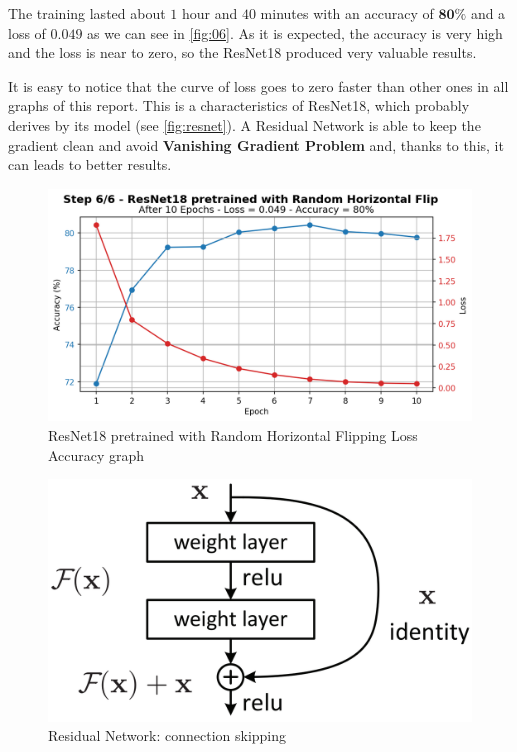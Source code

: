 \documentclass[a4paper, 11pt]{article}
\begin{document}
	The training lasted about $1$ hour and $40$ minutes with an accuracy of $\boldsymbol{80\%}$ and a loss of $\boldsymbol{0.049}$ as we can see in \vref{fig:06}.
	As it is expected, the accuracy is very high and the loss is near to zero, so the ResNet18 produced very valuable results.
	
	It is easy to notice that the curve of loss goes to zero faster than other ones in all graphs of this report.
	This is a characteristics of ResNet18, which probably derives by its model (see \vref{fig:resnet}). A Residual Network is able to keep the gradient clean and avoid \textbf{Vanishing Gradient Problem} and, thanks to this, it can leads to better results.
	
	
	\begin{figure}[ht!]
		\centering
		\includegraphics[width=0.62\paperwidth]{img/fig06.png}
		\caption{ResNet18 pretrained with Random Horizontal Flipping Loss Accuracy graph}
		\label{fig:06}
	\end{figure}

\begin{figure}[ht!]
	\centering
	\includegraphics[width=0.3\paperwidth]{img/res.png}
	\caption{Residual Network: connection skipping}
	\label{fig:resnet}
\end{figure}
\end{document}

